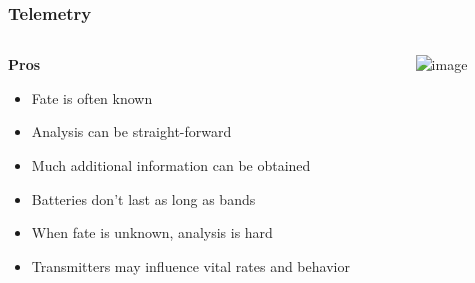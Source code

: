 \documentclass[color=usenames,dvipsnames]{beamer}\usepackage[]{graphicx}\usepackage[]{color}
\begin{document}
\begin{frame}
  \frametitle{Telemetry}
  \begin{columns}
    \begin{column}{0.5\textwidth}
      {\bf Pros}
      \begin{itemize}
        \item Fate is often known
        \item Analysis can be straight-forward
        \item Much additional information can be obtained
      \end{itemize}
      \begin{itemize}[<2->]
        \item Batteries don't last as long as bands
        \item When fate is unknown, analysis is hard
        \item Transmitters may influence vital rates and behavior
      \end{itemize}
    \end{column}
    \begin{column}{0.5\textwidth}
      \includegraphics<1->[width=\textwidth]{figs/saltie} \\
      \vfill
    \end{column}
  \end{columns}
\end{frame}



\end{document}
